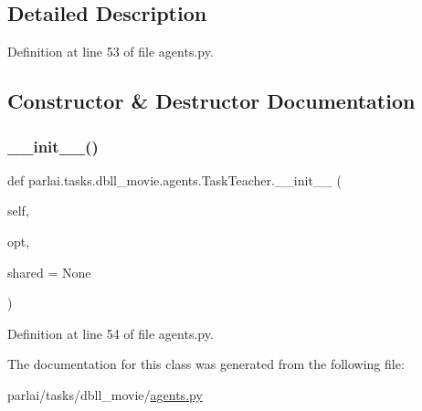 \subsection{Detailed Description}


Definition at line 53 of file agents.\+py.



\subsection{Constructor \& Destructor Documentation}
\mbox{\label{classparlai_1_1tasks_1_1dbll__movie_1_1agents_1_1TaskTeacher_a2eed62654cfdb4fc25372c15bbb810b3}} 
\subsubsection{\texorpdfstring{\+\_\+\+\_\+init\+\_\+\+\_\+()}{\_\_init\_\_()}}
{\footnotesize\ttfamily def parlai.\+tasks.\+dbll\+\_\+movie.\+agents.\+Task\+Teacher.\+\_\+\+\_\+init\+\_\+\+\_\+ (\begin{DoxyParamCaption}\item[{}]{self,  }\item[{}]{opt,  }\item[{}]{shared = {\ttfamily None} }\end{DoxyParamCaption})}



Definition at line 54 of file agents.\+py.



The documentation for this class was generated from the following file\+:\begin{DoxyCompactItemize}
\item 
parlai/tasks/dbll\+\_\+movie/\hyperlink{parlai_2tasks_2dbll__movie_2agents_8py}{agents.\+py}\end{DoxyCompactItemize}
